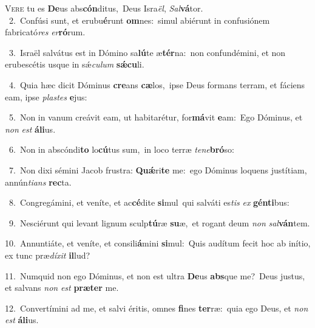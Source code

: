 \lettrine{\initial\textcolor{\initialcolor}{V}}{ere} tu es \textbf{De}\-us abs\-\textbf{cón}\-ditus,~\star Deus Isra\-\textit{ël}\-, \textit{Sal}\-\textbf{vá}tor.\\
{\numbfont\textcolor{\numbcolor}{~2.}}~Confúsi sunt, et erubu\-\textbf{é}\-runt \textbf{om}\-nes:~\star simul abiérunt in confusiónem fabricató\textit{res} \textit{er}\-\textbf{ró}rum.\par
{\numbfont\textcolor{\numbcolor}{~3.}}~Israël salvátus est in Dómino sa\-\textbf{lú}\-te æ\-\textbf{tér}\-na:~\star non confundémini, et non erubescétis usque in sǽ\-\textit{cu}\-\textit{lum} \textbf{sǽ}\-\textbf{cu}li.\par
{\numbfont\textcolor{\numbcolor}{~4.}}~Quia hæc dicit Dóminus \textbf{cre}\-ans \textbf{cæ}\-los,~\star ipse Deus formans terram, et fáciens eam, ipse \textit{plas}\-\textit{tes} \textbf{e}\-jus:\par
{\numbfont\textcolor{\numbcolor}{~5.}}~Non in vanum creávit eam, ut habitarétur, for\-\textbf{má}\-vit \textbf{e}\-am:~\star Ego Dóminus, et \textit{non} \textit{est} \textbf{á}\-\textbf{li}us.\par
{\numbfont\textcolor{\numbcolor}{~6.}}~Non in abscóndi\textbf{to} lo\-\textbf{cú}\-tus sum,~\star in loco terræ \textit{te}\-\textit{ne}\textbf{bró}so:\par
{\numbfont\textcolor{\numbcolor}{~7.}}~Non dixi sémini Jacob frustra: \textbf{Quǽ}\-ri\textbf{te} me:~\star ego Dóminus loquens justítiam, annún\-\textit{ti}\-\textit{ans} \textbf{rec}\-ta.\par
{\numbfont\textcolor{\numbcolor}{~8.}}~Congregámini, et veníte, et ac\-\textbf{cé}\-dite \textbf{si}\-mul~\star qui salváti es\textit{tis} \textit{ex} \textbf{gén}\-\textbf{ti}bus:\par
{\numbfont\textcolor{\numbcolor}{~9.}}~Nesciérunt qui levant lignum sculp\-\textbf{tú}\-ræ \textbf{su}\-æ,~\star et rogant deum \textit{non} \textit{sal}\-\textbf{ván}tem.\par
{\numbfont\textcolor{\numbcolor}{10.}}~Annuntiáte, et veníte, et consili\-\textbf{á}\-mini \textbf{si}\-mul:~\star Quis audítum fecit hoc ab inítio, ex tunc præ\-\textit{dí}\-\textit{xit} \textbf{il}\-lud?\par
{\numbfont\textcolor{\numbcolor}{11.}}~Numquid non ego Dóminus, et non est ultra \textbf{De}\-us \textbf{abs}\-que me?~\star Deus justus, et salvans \textit{non} \textit{est} \textbf{præ}\-\textbf{ter} me.\par
{\numbfont\textcolor{\numbcolor}{12.}}~Convertímini ad me, et salvi éritis, omnes \textbf{fi}\-nes \textbf{ter}\-ræ:~\star quia ego Deus, et \textit{non} \textit{est} \textbf{á}\-\textbf{li}us.\par
